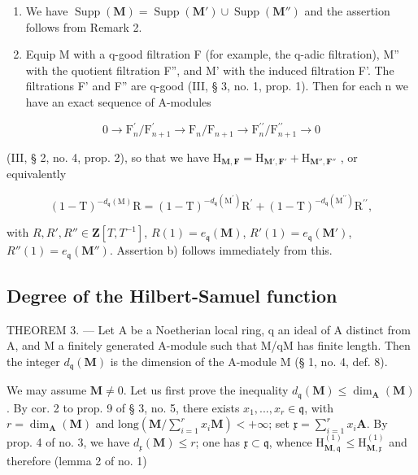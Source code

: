 \begin{enumerate}
\def\labelenumi{\alph{enumi})}
\item
  We have \(\operatorname{Supp}(\mathbf{M}) = \operatorname{Supp}(\mathbf{M}') \cup \operatorname{Supp}(\mathbf{M}'')\) and the assertion follows from Remark 2.
\item
  Equip M with a q-good filtration F (for example, the q-adic filtration), M'' with the quotient filtration F'', and M' with the induced filtration F'. The filtrations F' and F'' are q-good (III, § 3, no. 1, prop. 1). Then for each n we have an exact sequence of A-modules
\end{enumerate}

\[
0 \rightarrow \mathrm{F} _ {n} ^ {\prime} / \mathrm{F} _ {n + 1} ^ {\prime} \rightarrow \mathrm{F} _ {n} / \mathrm{F} _ {n + 1} \rightarrow \mathrm{F} _ {n} ^ {\prime \prime} / \mathrm{F} _ {n + 1} ^ {\prime \prime} \rightarrow 0
\]

(III, § 2, no. 4, prop. 2), so that we have \(\mathrm{H}_{\mathbf{M},\mathbf{F}} = \mathrm{H}_{\mathbf{M}',\mathbf{F}'} + \mathrm{H}_{\mathbf{M}'',\mathbf{F}''}\) , or equivalently

\[
(1 - \mathrm{T}) ^ {- d _ {\mathfrak {q}} (\mathrm{M})} \mathrm{R} = (1 - \mathrm{T}) ^ {- d _ {\mathfrak {q}} (\mathrm{M} ^ {\prime})} \mathrm{R} ^ {\prime} + (1 - \mathrm{T}) ^ {- d _ {\mathfrak {q}} (\mathrm{M} ^ {\prime \prime})} \mathrm{R} ^ {\prime \prime},
\]

with \(R,R',R''\in\mathbf{Z}[T,T^{-1}]\), \(R(1)=e_{\mathfrak{q}}(\mathbf{M})\), \(R'(1)=e_{\mathfrak{q}}(\mathbf{M}')\), \(R''(1)=e_{\mathfrak{q}}(\mathbf{M}'')\). Assertion b) follows immediately from this.

\subsection{Degree of the Hilbert-Samuel function}

THEOREM 3. --- Let A be a Noetherian local ring, q an ideal of A distinct from A, and M a finitely generated A-module such that M/qM has finite length. Then the integer \(d_{\mathfrak{q}}(\mathbf{M})\) is the dimension of the A-module M (§ 1, no. 4, def. 8).

We may assume \(\mathbf{M} \neq 0\). Let us first prove the inequality \(d_{\mathfrak{q}}(\mathbf{M}) \leqslant \dim_{\mathbf{A}}(\mathbf{M})\). By cor. 2 to prop. 9 of § 3, no. 5, there exists \(x_1, ..., x_r \in \mathfrak{q}\), with \(r = \dim_{\mathbf{A}}(\mathbf{M})\) and \(\text{long}(\mathbf{M}/\sum_{i=1}^{r} x_i \mathbf{M}) < +\infty\); set \(\mathfrak{x} = \sum_{i=1}^{r} x_i \mathbf{A}\). By prop. 4 of no. 3, we have \(d_{\mathfrak{x}}(\mathbf{M}) \leqslant r\); one has \(\mathfrak{x} \subset \mathfrak{q}\), whence \(\mathrm{H}_{\mathbf{M},\mathfrak{q}}^{(1)} \leqslant \mathrm{H}_{\mathbf{M},\mathfrak{x}}^{(1)}\) and therefore (lemma 2 of no. 1)

